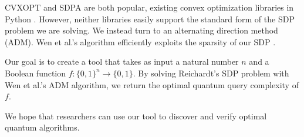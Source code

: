 CVXOPT and SDPA are both popular, existing convex optimization
libraries in Python \cite{cvxopt, SDPA}.
However, neither libraries easily support the standard form
of the SDP problem we are solving.
We instead turn to an alternating direction method (ADM).
Wen et al.'s algorithm efficiently exploits the 
sparsity of our SDP \cite{wen2010alternating}.

Our goal is to create a tool that takes as input a 
natural number $n$ and a Boolean function 
$f: \{0,1\}^n \rightarrow \{0,1\}$. 
By solving Reichardt's SDP problem with
Wen et al.'s ADM algorithm,
we return the optimal quantum query complexity of $f$.

We hope that researchers can use our tool to 
discover and verify optimal quantum algorithms.